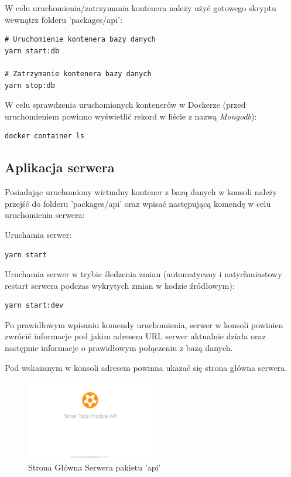 W celu uruchomienia/zatrzymania kontenera należy użyć gotowego skryptu wewnątrz folderu 'packages/api':

\begin{lstlisting}
# Uruchomienie kontenera bazy danych
yarn start:db

# Zatrzymanie kontenera bazy danych
yarn stop:db
\end{lstlisting}

W celu sprawdzenia uruchomionych kontenerów w Dockerze (przed uruchomieniem powinno wyświetlić rekord w liście z nazwą \textit{Mongodb}):

\begin{lstlisting}
docker container ls
\end{lstlisting}

\subsection{Aplikacja serwera}

Posiadając uruchomiony wirtualny kontener z bazą danych w konsoli należy przejść do folderu 'packages/api' oraz wpisać następującą komendę w celu uruchomienia serwera:

Uruchamia serwer:
\begin{lstlisting}
yarn start
\end{lstlisting}

Uruchamia serwer w trybie śledzenia zmian (automatyczny i natychmiastowy restart serwera podczas wykrytych zmian w kodzie źródłowym):
\begin{lstlisting}
yarn start:dev
\end{lstlisting}

Po prawidłowym wpisaniu komendy uruchomienia, serwer w konsoli powinien zwrócić informacje pod jakim adresem URL serwer aktualnie działa oraz następnie informacje o prawidłowym połączeniu z bazą danych.


Pod wskazanym w konsoli adresem powinna ukazać się strona główna serwera.

\begin{figure}[h!]
  \centering
    \includegraphics[width=0.5\textwidth]{images/api/stf_api_home.png}
  \caption{Strona Główna Serwera pakietu 'api'}
  \label{fig:mobile}
\end{figure}


